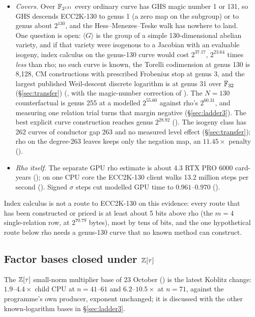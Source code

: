 \begin{itemize}
  $2^{106.52}$ ($+45.71$) at $w=2$, in unconverted column touches
  ().
  The studies behind these rows, and the hybrid guess that puts the $m=4$
  row at $+8.43$ to $+58.27$ bits, are in \S\ref{sec:binary-descent}.
\item \emph{Covers.} Over $\mathbb{F}_{2^{131}}$ every ordinary curve has GHS
  magic number 1 or 131, so GHS descends ECC2K-130 to genus 1 (a zero map on
  the subgroup) or to genus about $2^{130}$, and the Hess--Menezes--Teske walk
  has nowhere to land. One question is open: $\langle G\rangle$ is the group
  of a simple 130-dimensional abelian variety, and if that variety were
  isogenous to a Jacobian with an evaluable isogeny, index calculus on the
  genus-130 curve would cost $2^{37.17}$, $2^{23.64}$ times \emph{less} than
  rho; no such curve is known, the Torelli codimension at genus 130 is
  8{,}128, CM constructions with prescribed Frobenius stop at genus 3, and the
  largest published Weil-descent discrete logarithm is at genus 31 over
  $\mathbb{F}_{32}$ (\S\ref{sec:transfer})
  (, with the
  magic-number correction of
  ). The
  $N=130$ counterfactual is genus 255 at a modelled $2^{55.60}$ against rho's
  $2^{60.31}$, and measuring one relation trial turns that margin negative
  (\S\ref{sec:ladder3}). The best explicit curve construction reaches genus
  $2^{28.92}$
  ().
  The isogeny class has 262 curves of conductor gap 263 and no measured
  level effect (\S\ref{sec:transfer}); rho on the degree-263 leaves keeps
  only the negation map, an $11.45\times$ penalty
  ().
\item \emph{Rho itself.} The separate GPU rho estimate is about 4.3 RTX PRO
  6000 card-years (); on one CPU core the ECC2K-130
  client walks 13.2 million steps per second
  (). Signed $\sigma$ steps
  cut modelled GPU time to $0.961$--$0.970$
  ().
\end{itemize}
Index calculus is not a route to ECC2K-130 on this evidence: every route
that has been constructed or priced is at least about 5 bits above rho (the
$m=4$ single-relation row, at $2^{70.79}$ bytes), most by tens of bits, and
the one hypothetical route below rho needs a genus-130 curve that no known
method can construct.

\subsection{Factor bases closed under $\mathbb{Z}[\tau]$}

The $\mathbb{Z}[\tau]$ small-norm multiplier base of 23 October
() is the latest Koblitz
change: $1.9$--$4.4\times$ child CPU at $n=41$--$61$ and $6.2$--$10.5\times$
at $n=71$, against the programme's own producer, exponent unchanged; it is
discussed with the other known-logarithm bases in \S\ref{sec:ladder3}.
